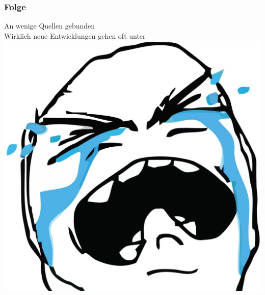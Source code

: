 \documentclass{beamer}
\begin{document}
\begin{frame}
  \frametitle{Folge}
  \begin{center}
    An wenige Quellen gebunden \pause\\
    Wirklich neue Entwicklungen gehen oft unter \pause\\
  \includegraphics[height=.5\textheight]{sadcrying}  
  \end{center}
\end{frame}
   
\end{document}
